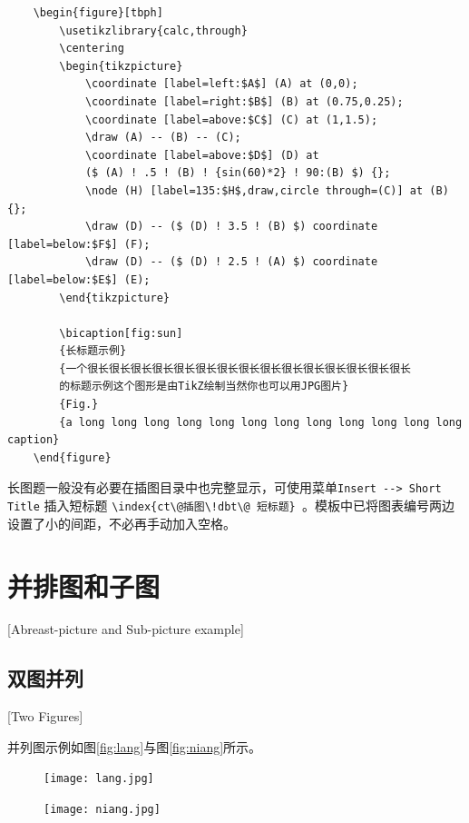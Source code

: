 \begin{lstlisting}
    \begin{figure}[tbph]
        \usetikzlibrary{calc,through}
        \centering
        \begin{tikzpicture}
            \coordinate [label=left:$A$] (A) at (0,0);
            \coordinate [label=right:$B$] (B) at (0.75,0.25);
            \coordinate [label=above:$C$] (C) at (1,1.5);
            \draw (A) -- (B) -- (C);
            \coordinate [label=above:$D$] (D) at
            ($ (A) ! .5 ! (B) ! {sin(60)*2} ! 90:(B) $) {};
            \node (H) [label=135:$H$,draw,circle through=(C)] at (B) {};
            \draw (D) -- ($ (D) ! 3.5 ! (B) $) coordinate [label=below:$F$] (F);
            \draw (D) -- ($ (D) ! 2.5 ! (A) $) coordinate [label=below:$E$] (E);
        \end{tikzpicture}

        \bicaption[fig:sun]
        {长标题示例}
        {一个很长很长很长很长很长很长很长很长很长很长很长很长很长很长很长
        的标题示例这个图形是由TikZ绘制当然你也可以用JPG图片}
        {Fig.}
        {a long long long long long long long long long long long long caption}
    \end{figure}
\end{lstlisting}

长图题一般没有必要在插图目录中也完整显示，可使用菜单\texttt{Insert -{}-\textgreater{} Short
Title} 插入短标题 \verb|\index{ct\@插图\!dbt\@ 短标题} |。模板中已将图表编号两边设置了小的间距，不必再手动加入空格。

\section{并排图和子图}[Abreast-picture and Sub-picture example]
\subsection{双图并列}[Two Figures]

并列图示例如图\ref{fig:lang}与图\ref{fig:niang}所示。

\begin{figure}[htbp]
  \centering
  \begin{minipage}{0.4\textwidth}
    \centering
    \texttt{[image: lang.jpg]}
  \end{minipage}
  \begin{minipage}{0.4\textwidth}
    \centering
    \texttt{[image: niang.jpg]}
  \end{minipage}
\end{figure}

